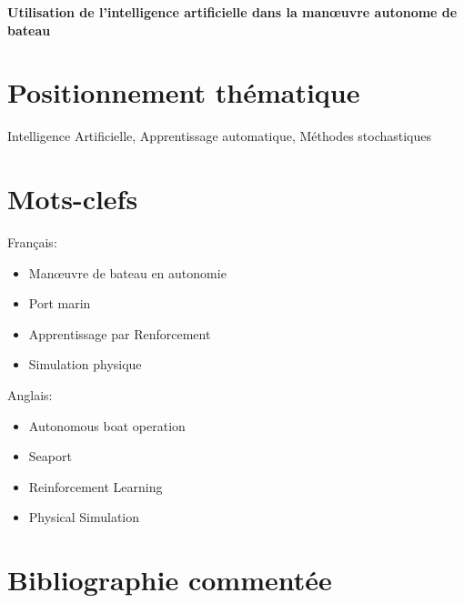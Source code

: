 \documentclass[12pt,a4paper]{extarticle}
\begin{document}
\begin{center}

\huge{{\color{SteelBlue}  \bfseries Utilisation de l'intelligence artificielle dans la manœuvre autonome de bateau}}
\end{center}

\section*{{\color{SteelBlue} \bfseries Positionnement thématique}}

Intelligence Artificielle, Apprentissage automatique, Méthodes stochastiques

\section*{{\color{SteelBlue} Mots-clefs}}

\begin{multicols}{2}

Français:

\begin{itemize}[label=\textbullet]

\item Manœuvre de bateau en autonomie
\item Port marin
\item Apprentissage par Renforcement
\item Simulation physique



\end{itemize}

Anglais:

\begin{itemize}[label=\textbullet]

\item Autonomous boat operation
\item Seaport
\item Reinforcement Learning
\item Physical Simulation


\end{itemize}

\end{multicols}

\section*{\color{SteelBlue} {Bibliographie commentée}}
\end{document}
